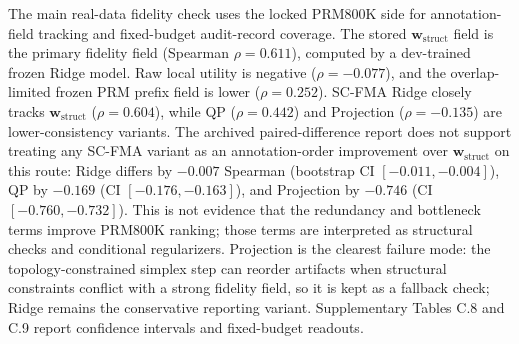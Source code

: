 \documentclass[pdflatex,sn-mathphys-num,iicol]{sn-jnl}
\newcommand{\wstruct}{\ensuremath{\mathbf{w}_{\mathrm{struct}}}}
\begin{document}
The main real-data fidelity check uses the locked PRM800K side for annotation-field tracking and fixed-budget audit-record coverage. The stored \wstruct{} field is the primary fidelity field (Spearman $\rho = 0.611$), computed by a dev-trained frozen Ridge model. Raw local utility is negative ($\rho = -0.077$), and the overlap-limited frozen PRM prefix field is lower ($\rho = 0.252$). SC-FMA Ridge closely tracks \wstruct{} ($\rho = 0.604$), while QP ($\rho = 0.442$) and Projection ($\rho = -0.135$) are lower-consistency variants. The archived paired-difference report does not support treating any SC-FMA variant as an annotation-order improvement over \wstruct{} on this route: Ridge differs by $-0.007$ Spearman (bootstrap CI $[-0.011,-0.004]$), QP by $-0.169$ (CI $[-0.176,-0.163]$), and Projection by $-0.746$ (CI $[-0.760,-0.732]$). This is not evidence that the redundancy and bottleneck terms improve PRM800K ranking; those terms are interpreted as structural checks and conditional regularizers. Projection is the clearest failure mode: the topology-constrained simplex step can reorder artifacts when structural constraints conflict with a strong fidelity field, so it is kept as a fallback check; Ridge remains the conservative reporting variant. Supplementary Tables C.8 and C.9 report confidence intervals and fixed-budget readouts.
\end{document}
